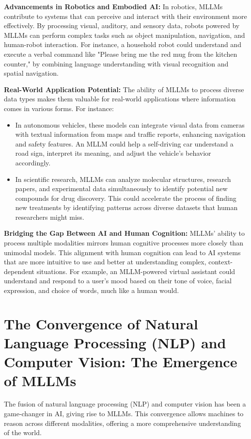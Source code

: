 \textbf{Advancements in Robotics and Embodied AI:} In robotics, MLLMs contribute to systems that can perceive and interact with their environment more effectively. By processing visual, auditory, and sensory data, robots powered by MLLMs can perform complex tasks such as object manipulation, navigation, and human-robot interaction. For instance, a household robot could understand and execute a verbal command like "Please bring me the red mug from the kitchen counter," by combining language understanding with visual recognition and spatial navigation.

\textbf{Real-World Application Potential:} The ability of MLLMs to process diverse data types makes them valuable for real-world applications where information comes in various forms. For instance:

\begin{itemize}
    \item In autonomous vehicles, these models can integrate visual data from cameras with textual information from maps and traffic reports, enhancing navigation and safety features. An MLLM could help a self-driving car understand a road sign, interpret its meaning, and adjust the vehicle's behavior accordingly.
    \item In scientific research, MLLMs can analyze molecular structures, research papers, and experimental data simultaneously to identify potential new compounds for drug discovery. This could accelerate the process of finding new treatments by identifying patterns across diverse datasets that human researchers might miss.
\end{itemize}

\textbf{Bridging the Gap Between AI and Human Cognition:} MLLMs' ability to process multiple modalities mirrors human cognitive processes more closely than unimodal models. This alignment with human cognition can lead to AI systems that are more intuitive to use and better at understanding complex, context-dependent situations. For example, an MLLM-powered virtual assistant could understand and respond to a user's mood based on their tone of voice, facial expression, and choice of words, much like a human would.

\section{The Convergence of Natural Language Processing (NLP) and Computer Vision: The Emergence of MLLMs}

The fusion of natural language processing (NLP) and computer vision has been a game-changer in AI, giving rise to MLLMs. This convergence allows machines to reason across different modalities, offering a more comprehensive understanding of the world.

